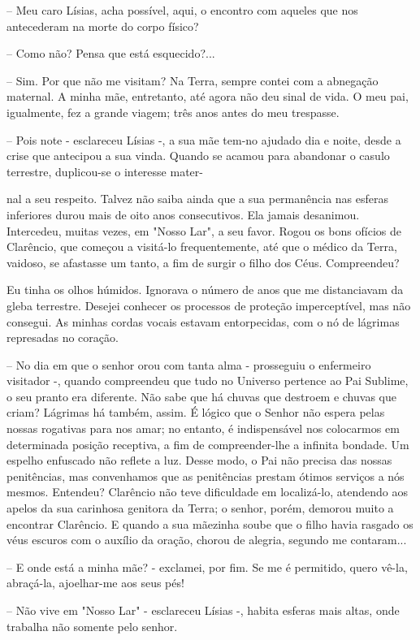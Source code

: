 \documentclass[portuguese,12pt,a4paper]{scrbook}
\begin{document}
	– Meu caro Lísias, acha possível, aqui, o encontro com aqueles que nos antecederam na morte do corpo físico?
	
	– Como não? Pensa que está esquecido?...
	
	– Sim. Por que não me visitam? Na Terra, sempre contei com a abnegação maternal. A minha mãe, entretanto, até agora não deu sinal de vida. O meu pai, igualmente, fez a grande viagem; três anos antes do meu trespasse.
	
	– Pois note - esclareceu Lísias -, a sua mãe tem-no ajudado dia e noite, desde a crise que antecipou a sua vinda. Quando se acamou para abandonar o casulo terrestre, duplicou-se o interesse mater-
	
	
	nal a seu respeito. Talvez não saiba ainda que a sua permanência nas esferas inferiores durou mais de oito anos consecutivos. Ela jamais desanimou. Intercedeu, muitas vezes, em "Nosso Lar", a seu favor. Rogou os bons ofícios de Clarêncio, que começou a visitá-lo frequentemente, até que o médico da Terra, vaidoso, se afastasse um tanto, a fim de surgir o filho dos Céus. Compreendeu?
	
	Eu tinha os olhos húmidos. Ignorava o número de anos que me distanciavam da gleba terrestre. Desejei conhecer os processos de proteção imperceptível, mas não consegui. As minhas cordas vocais estavam entorpecidas, com o nó de lágrimas represadas no coração.
	
	– No dia em que o senhor orou com tanta alma - prosseguiu o enfermeiro visitador -, quando compreendeu que tudo no Universo pertence ao Pai Sublime, o seu pranto era diferente. Não sabe que há chuvas que destroem e chuvas que criam? Lágrimas há também, assim. É lógico que o Senhor não espera pelas nossas rogativas para nos amar; no entanto, é indispensável nos colocarmos em determinada posição receptiva, a fim de compreender-lhe a infinita bondade. Um espelho enfuscado não reflete a luz. Desse modo, o Pai não precisa das nossas penitências, mas convenhamos que as penitências prestam ótimos serviços a nós mesmos. Entendeu? Clarêncio não teve dificuldade em localizá-lo, atendendo aos apelos da sua carinhosa genitora da Terra; o senhor, porém, demorou muito a encontrar Clarêncio. E quando a sua mãezinha soube que o filho havia rasgado os véus escuros com o auxílio da oração, chorou de alegria, segundo me contaram...
	
	– E onde está a minha mãe? - exclamei, por fim. Se me é permitido, quero vê-la, abraçá-la, ajoelhar-me aos seus pés!
	
	– Não vive em "Nosso Lar" - esclareceu Lísias -, habita esferas mais altas, onde trabalha não somente pelo senhor.
	
\end{document}
